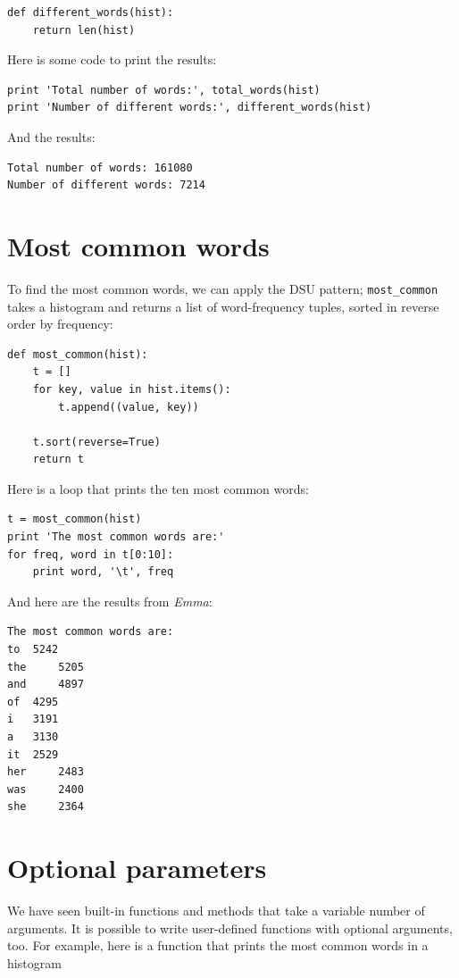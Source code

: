 \documentclass[10pt]{book}
\begin{document}
\begin{verbatim}
def different_words(hist):
    return len(hist)
\end{verbatim}
%
Here is some code to print the results:

\begin{verbatim}
print 'Total number of words:', total_words(hist)
print 'Number of different words:', different_words(hist)
\end{verbatim}
%
And the results:

\begin{verbatim}
Total number of words: 161080
Number of different words: 7214
\end{verbatim}
%

\section{Most common words}

To find the most common words, we can apply the DSU pattern;
\verb"most_common" takes a histogram and returns a list of
word-frequency tuples, sorted in reverse order by frequency:

\begin{verbatim}
def most_common(hist):
    t = []
    for key, value in hist.items():
        t.append((value, key))

    t.sort(reverse=True)
    return t
\end{verbatim}
%
Here is a loop that prints the ten most common words:

\begin{verbatim}
t = most_common(hist)
print 'The most common words are:'
for freq, word in t[0:10]:
    print word, '\t', freq
\end{verbatim}
%
And here are the results from {\em Emma}:

\begin{verbatim}
The most common words are:
to 	5242
the 	5205
and 	4897
of 	4295
i 	3191
a 	3130
it 	2529
her 	2483
was 	2400
she 	2364
\end{verbatim}
%

\section{Optional parameters}

We have seen built-in functions and methods that take a variable
number of arguments.  It is possible to write user-defined functions
with optional arguments, too.  For example, here is a function that
prints the most common words in a histogram
\end{document}
